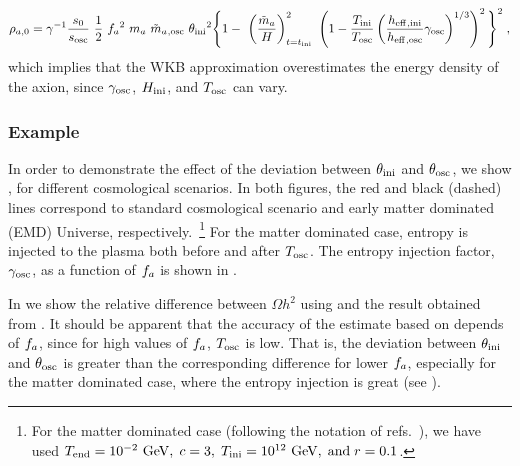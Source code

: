 \documentclass[11pt,a4paper]{article}
\begin{document}
%
\begin{eqnarray}
	\rho_{a,0} = \gamma^{-1}  \dfrac{s_0}{s_{\rm osc}} \  \dfrac{1 }{2}  \ f_{a}{}^2 \ m_{a}{} \ \tilde m_{a}{}_{,{\rm osc}} \ \theta_{\rm ini}{}^2 \Bigg\{ 
		1 - \ \left( \dfrac{\tilde m_{a}{}}{H} \right)_{t=t_{\rm ini}{}}^2 \  \left( 1- \dfrac{T_{\rm ini}{}}{T_{\rm osc}{}}\left( \dfrac{h_{\rm eff}{}_{,\rm ini}}{h_{\rm eff}{}_{,\rm osc}}\gamma_{\rm osc} \right)^{1/3} \right)^{2}    \Bigg\}^2    \;,
	\label{eq:rho_a_NLO} 
\end{eqnarray}
%
which implies that the WKB approximation overestimates the energy density of the axion, since $\gamma_{\rm osc}$, $H_{\rm ini}$, and $T_{\rm osc}{}$ can vary. 

\subsubsection{Example}\label{sec:comparison_between_WKB_approaches}
In order to demonstrate the effect of the deviation between $\theta_{\rm ini}{}$ and $\theta_{\rm osc}{}$, we show , for different cosmological scenarios. In both figures, the red and black (dashed) lines correspond to standard cosmological scenario and early matter dominated (EMD) Universe, respectively.~\footnote{For the matter dominated case (following the notation of refs.~\cite{Arias:2019uol,Arias:2020qty}), we have used 
$T_{\rm end}=10^{-2} ~{\rm GeV},\; c=3, \; T_{\rm ini}=10^{12} ~{\rm GeV}, \; \text{and}\; r=0.1$.} For the matter dominated case, entropy is injected to the plasma both before and after $T_{\rm osc}{}$. The entropy injection factor, $\gamma_{\rm osc}$, as a function of $f_{a}{}$ is shown in .

In  we show the relative difference between $\Omega h^2$ using  and the result obtained from \mimes. It should be apparent that the accuracy of the estimate based on  depends of $f_{a}{}$, since for high values of $f_{a}{}$, $T_{\rm osc}{}$ is low. That is, the deviation between $\theta_{\rm ini}{}$ and $\theta_{\rm osc}{}$ is greater than the corresponding difference for lower $f_{a}{}$, especially for the matter dominated case, where the entropy injection is great (see ).
\end{document}
